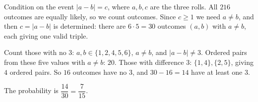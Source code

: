 Condition on the event $|a-b|=c$, where $a,b,c$ are the three rolls. All $216$ outcomes are equally likely, so we count outcomes. Since $c\ge1$ we need $a\ne b$, and then $c=|a-b|$ is determined: there are $6\cdot5=30$ outcomes $(a,b)$ with $a\ne b$, each giving one valid triple.

Count those with no $3$: $a,b\in\{1,2,4,5,6\}$, $a\ne b$, and $|a-b|\ne3$. Ordered pairs from these five values with $a\ne b$: $20$. Those with difference $3$: $\{1,4\},\{2,5\}$, giving $4$ ordered pairs. So $16$ outcomes have no $3$, and $30-16=14$ have at least one $3$.

The probability is $\dfrac{14}{30}=\boxed{\dfrac{7}{15}}$.

